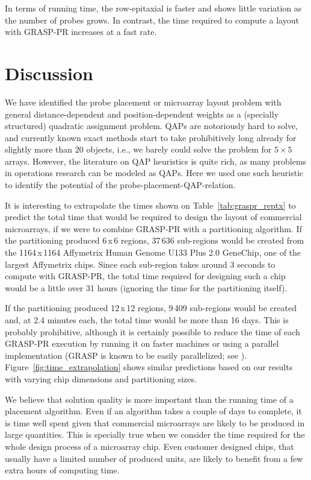 \documentclass[english]{lni}
\begin{document}
In terms of running time, the row-epitaxial is faster and shows little variation
as the number of probes grows. In contrast, the time required to compute a
layout with GRASP-PR increases at a fast rate.

\section{Discussion}
\label{sec:discussion}

We have identified the probe placement or microarray layout problem with
general distance-dependent and position-dependent weights as a (specially
structured) quadratic assignment problem. QAPs are notoriously hard to solve,
and currently known exact methods start to take prohibitively long already for
slightly more than $20$ objects, i.e., we barely could solve the problem for
$5\times 5$ arrays. However, the literature on QAP heuristics is quite rich,
as many problems in operations research can be modeled as QAPs. Here we used
one such heuristic to identify the potential of the
probe-placement-QAP-relation.

It is interesting to extrapolate the times shown on Table~\ref{tab:graspr_reptx}
to predict the total time that would be required to design the layout of
commercial microarrays, if we were to combine GRASP-PR with a partitioning
algorithm. If the partitioning produced 6\,x\,6 regions, 37\,636 sub-regions
would be created from the 1164\,x\,1164 Affymetrix Human Genome U133 Plus 2.0
GeneChip\raisebox{.6ex}{\scriptsize \textregistered}, one of the largest
Affymetrix chips. Since each sub-region takes around 3 seconds to compute with
GRASP-PR, the total time required for designing such a chip would be a little
over 31 hours (ignoring the time for the partitioning itself).

If the partitioning produced 12\,x\,12 regions, 9\,409 sub-regions would be
created and, at 2.4 minutes each, the total time would be more than 16 days.
This is probably prohibitive, although it is certainly possible to reduce the
time of each GRASP-PR execution by running it on faster machines or using a
parallel implementation (GRASP is known to be easily parallelized; see
\cite{LI94}). Figure~\ref{fig:time_extrapolation} shows similar predictions
based on our results with varying chip dimensions and partitioning sizes.

We believe that solution quality is more important than the running time of a
placement algorithm. Even if an algorithm takes a couple of days to complete,
it is time well spent given that commercial microarrays are likely to be
produced in large quantities. This is specially true when we consider the time
required for the whole design process of a microarray chip. Even customer
designed chips, that usually have a limited number of produced units, are likely
to benefit from a few extra hours of computing time.
\end{document}
